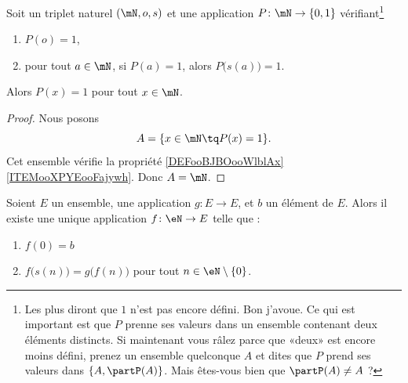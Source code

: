 \begin{proposition}      \label{PROPooXTRCooKwrWkq}
	Soit un triplet naturel \( (\mN,o,s)\) et une application \( P\colon \mN\to \{ 0,1 \}\) vérifiant\footnote{Les plus  diront que \( 1\) n'est pas encore défini. Bon j'avoue. Ce qui est important est que \( P\) prenne ses valeurs dans un ensemble contenant deux éléments distincts. Si maintenant vous râlez parce que «deux» est encore moins défini, prenez un ensemble quelconque \( A\) et dites que \( P\) prend ses valeurs dans \( \{ A, \partP(A)\}\). Mais êtes-vous bien  que \( \partP(A)\neq A\) ?}
	\begin{enumerate}
		\item
		      \( P(o)=1\),
		\item
		      pour tout \( a\in \mN\), si \( P(a)=1\), alors \( P\big( s(a) \big)=1\).
	\end{enumerate}
	Alors \( P(x)=1\) pour tout \( x\in \mN\).
\end{proposition}

\begin{proof}
	Nous posons
	\begin{equation}
		A=\{ x\in\mN\tq P(x)=1 \}.
	\end{equation}
	Cet ensemble vérifie la propriété \ref{DEFooBJBOooWlblAx}\ref{ITEMooXPYEooFajywh}. Donc \( A=\mN\).
\end{proof}

\begin{theorem}       \label{THOooEJPYooZFVnez}
	Soient \( E\) un ensemble, une application \(g \colon E\to E  \), et \( b\) un élément de \( E\).  Alors il existe une unique application \( f\colon \eN\to E\) telle que :
	\begin{enumerate}
		\item
		      \( f(0)=b\)
		\item
		      \( f\big( s(n) \big)=g\big( f(n) \big)\) pour tout \( n\in \eN\setminus\{ 0 \}\).
	\end{enumerate}
\end{theorem}

